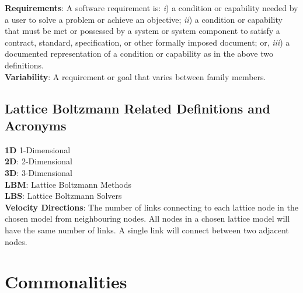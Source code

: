 \documentclass[12pt]{article}
\begin{document}
\noindent\textbf{Requirements}: A software requirement is: \textit{i}) a condition or capability needed by a user to solve a problem or achieve an objective; \textit{ii}) a condition or capability that must be met or possessed by a system or system component to satisfy a contract, standard, specification, or other formally imposed document; or, \textit{iii}) a documented representation of a condition or capability as in the above two definitions. \cite{thayer2000ieee}\\

\noindent\textbf{Variability}: A requirement or goal that varies between family members.

\subsection{Lattice Boltzmann Related Definitions and Acronyms}

\noindent\textbf{1D} 1-Dimensional\\

\noindent\textbf{2D}: 2-Dimensional\\

\noindent\textbf{3D}: 3-Dimensional\\
 
\noindent\textbf{LBM}: Lattice Boltzmann Methods\\

\noindent\textbf{LBS}: Lattice Boltzmann Solvers\\

\noindent\textbf{Velocity Directions}: The number of links connecting to each lattice node in the chosen model from neighbouring nodes. All nodes in a chosen lattice model will have the same number of links. A single link will connect between two adjacent nodes.
	

\newpage
\section{Commonalities}\label{comm_sec}
\end{document}
